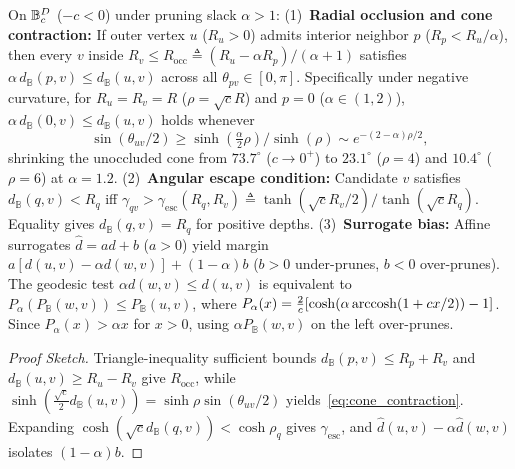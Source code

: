 \begin{theorem}
\label{thm:vamana_pathologies}
On $\mathbb{B}_c^D$ ($-c < 0$) under pruning slack $\alpha > 1$:
(1)~\textbf{Radial occlusion and cone contraction:} If outer vertex $u$ ($R_u > 0$) admits interior neighbor $p$ ($R_p < R_u / \alpha$), then every $v$ inside $R_v \le R_{\mathrm{occ}} \triangleq (R_u - \alpha R_p)/(\alpha + 1)$ satisfies $\alpha\,d_{\mathbb{B}}(p, v) \le d_{\mathbb{B}}(u, v)$ across all $\theta_{pv} \in [0, \pi]$.
Specifically under negative curvature, for $R_u = R_v = R$ ($\rho = \sqrt{c}R$) and $p = 0$ ($\alpha \in (1, 2)$), $\alpha\,d_{\mathbb{B}}(0, v) \le d_{\mathbb{B}}(u, v)$ holds whenever
\begin{equation}
  \sin(\theta_{uv}/2) \ge \sinh(\tfrac{\alpha}{2}\rho)/\sinh(\rho) \sim e^{-(2-\alpha)\rho/2},
  \label{eq:cone_contraction}
\end{equation}
shrinking the unoccluded cone from $73.7^\circ$ ($c \to 0^+$) to $23.1^\circ$ ($\rho = 4$) and $10.4^\circ$ ($\rho = 6$) at $\alpha = 1.2$.
(2)~\textbf{Angular escape condition:} Candidate $v$ satisfies $d_{\mathbb{B}}(q, v) < R_q$ iff $\gamma_{qv} > \gamma_{\mathrm{esc}}(R_q, R_v) \triangleq \tanh(\sqrt{c}R_v / 2)/\tanh(\sqrt{c}R_q)$. Equality gives $d_{\mathbb{B}}(q,v)=R_q$ for positive depths.
(3)~\textbf{Surrogate bias:} Affine surrogates $\hat{d} = a d + b$ ($a > 0$) yield margin $a[d(u, v) - \alpha d(w, v)] + (1 - \alpha)b$ ($b > 0$ under-prunes, $b < 0$ over-prunes). The geodesic test $\alpha d(w,v)\le d(u,v)$ is equivalent to $P_\alpha(P_{\mathbb B}(w,v))\le P_{\mathbb B}(u,v)$, where $P_\alpha(x)=\frac{2}{c}[\cosh(\alpha\operatorname{arccosh}(1+cx/2))-1]$. Since $P_\alpha(x)>\alpha x$ for $x>0$, using $\alpha P_{\mathbb B}(w,v)$ on the left over-prunes.
\end{theorem}
\begin{proof}[Proof Sketch]
Triangle-inequality sufficient bounds $d_{\mathbb{B}}(p, v) \le R_p + R_v$ and $d_{\mathbb{B}}(u, v) \ge R_u - R_v$ give $R_{\mathrm{occ}}$, while $\sinh(\frac{\sqrt{c}}{2}d_{\mathbb{B}}(u, v)) = \sinh\rho\sin(\theta_{uv}/2)$ yields~\eqref{eq:cone_contraction}.
Expanding $\cosh(\sqrt{c}d_{\mathbb{B}}(q, v)) < \cosh\rho_q$ gives $\gamma_{\mathrm{esc}}$, and $\hat{d}(u, v) - \alpha\hat{d}(w, v)$ isolates $(1 - \alpha)b$.
\end{proof}

